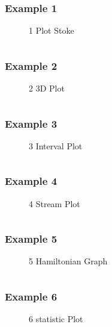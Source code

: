 \subsubsection{Example 1}
\begin{figure}[!htb]
    \centering
    
    \caption{1 Plot Stoke}
    \label{fig:1-plot-stoke}
\end{figure}
\inputminted{mathematica}{./gallery/example_1.wls}
\newpage


\subsubsection{Example 2}
\begin{figure}[!htb]
    \centering
    
    \caption{2 3D Plot}
    \label{fig:2-3d-plot}
\end{figure}
\inputminted{mathematica}{./gallery/example_2.wls}
\newpage


\subsubsection{Example 3}
\begin{figure}[!htb]
    \centering
    
    \caption{3 Interval Plot}
    \label{fig:3-interval-plot}
\end{figure}
\inputminted{mathematica}{./gallery/example_3.wls}
\newpage


\subsubsection{Example 4}
\begin{figure}[!htb]
    \centering
    
    \caption{4 Stream Plot}
    \label{fig:4-stream-plot}
\end{figure}
\inputminted{mathematica}{./gallery/example_4.wls}
\newpage

\subsubsection{Example 5}
\begin{figure}[!htb]
    \centering
    
    \caption{5 Hamiltonian Graph}
    \label{fig:5-hamiltonian-graph}
\end{figure}
\inputminted{mathematica}{./gallery/example_5.wls}
\newpage


\subsubsection{Example 6}
\begin{figure}[!htb]
    \centering
    
    \caption{6 statistic Plot}
    \label{fig:6-statistic-plot}
\end{figure}
\inputminted{mathematica}{./gallery/example_6.wls}
\newpage



